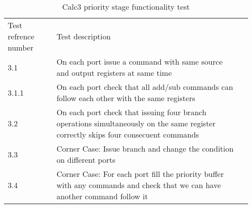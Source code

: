 \documentclass[a4paper, 11pt]{article}
\begin{document}
\begin{table}[H]
    \centering
    \begin{tabular}{lp{12cm}l}
        \toprule
        Test refrence number& Test description\\
        \cmidrule(r){1-1}\cmidrule(lr){2-2}
        3.1 & On each port issue a command with same source and output
        registers at same time \\
        3.1.1 & On each port check that all add/sub commands can follow each
        other with the same registers \\
        3.2 & On each port check that issuing four branch operations 
        simultaneously on the same register correctly skips four 
        consecuent commands \\
        3.3 & Corner Case: Issue branch and change the condition on 
        different ports \\
        3.4 & Corner Case: For each port fill the priority buffer with any 
        commands and check that we can have another command follow it \\
        \bottomrule
    \end{tabular}
    \caption{Calc3 priority stage functionality test}
    \label{table:5}
\end{table}
\end{document}
